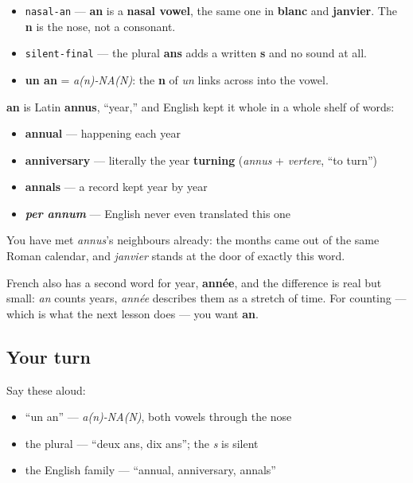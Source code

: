 \begin{sounds}
\begin{itemize}
\raggedright
  \item \texttt{nasal-an} — \textbf{an} is a \textbf{nasal vowel}, the same one in \textbf{blanc} and \textbf{janvier}. The \textbf{n} is the nose, not a consonant.
  \item \texttt{silent-final} — the plural \textbf{ans} adds a written \textbf{s} and no sound at all.
  \item \textbf{un an} = \emph{a(n)-NA(N)}: the \textbf{n} of \emph{un} links across into the vowel.
\end{itemize}
\end{sounds}

\begin{cousinweb}
\textbf{an} is Latin \textbf{annus}, \textquotedblleft{}year,\textquotedblright{} and English kept it whole in a whole shelf of words:

\begin{itemize}
\raggedright
  \item \textbf{annual} — happening each year
  \item \textbf{anniversary} — literally the year \textbf{turning} (\emph{annus} + \emph{vertere}, \textquotedblleft{}to turn\textquotedblright{})
  \item \textbf{annals} — a record kept year by year
  \item \emph{\textbf{per annum}} — English never even translated this one
\end{itemize}

You have met \emph{annus}'s neighbours already: the months came out of the same Roman calendar, and \emph{janvier} stands at the door of exactly this word.

French also has a second word for year, \textbf{année}, and the difference is real but small: \emph{an} counts years, \emph{année} describes them as a stretch of time. For counting — which is what the next lesson does — you want \textbf{an}.
\end{cousinweb}

\subsection*{Your turn}
Say these aloud:

\begin{itemize}
\raggedright
  \item \textquotedblleft{}un an\textquotedblright{} — \emph{a(n)-NA(N)}, both vowels through the nose
  \item the plural — \textquotedblleft{}deux ans, dix ans\textquotedblright{}; the \emph{s} is silent
  \item the English family — \textquotedblleft{}annual, anniversary, annals\textquotedblright{}
\end{itemize}

